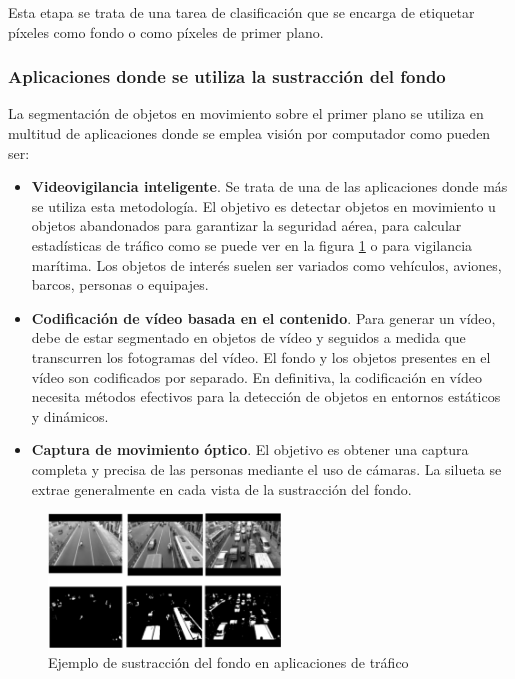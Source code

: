 Esta etapa se trata de una tarea de clasificación que se encarga de etiquetar píxeles como fondo o como píxeles de primer plano.

\subsubsection*{Aplicaciones donde se utiliza la sustracción del fondo}
\label{subsubsec:aplicaciones-background-subtraction}

La segmentación de objetos en movimiento sobre el primer plano se utiliza en multitud de aplicaciones donde se emplea visión por computador como pueden ser:

\begin{itemize}
    \item \textbf{Videovigilancia inteligente}. Se trata de una de las aplicaciones donde más se utiliza esta metodología. El objetivo es detectar objetos en movimiento u objetos abandonados para garantizar la seguridad aérea, para calcular estadísticas de tráfico como se puede ver en la figura \ref{fig:background-subtraction-example} o para vigilancia marítima. Los objetos de interés suelen ser variados como vehículos, aviones, barcos, personas o equipajes.
    \item \textbf{Codificación de vídeo basada en el contenido}. Para generar un vídeo, debe de estar segmentado en objetos de vídeo y seguidos a medida que transcurren los fotogramas del vídeo. El fondo y los objetos presentes en el vídeo son codificados por separado. En definitiva, la codificación en vídeo necesita métodos efectivos para la detección de objetos en entornos estáticos y dinámicos.
    \item \textbf{Captura de movimiento óptico}. El objetivo es obtener una captura completa y precisa de las personas mediante el uso de cámaras. La silueta se extrae generalmente en cada vista de la sustracción del fondo.
\end{itemize}

\begin{figure}[ht]
\centering
\includegraphics[width=0.55\textwidth]{img/chapters/estado-del-arte/background-subtraction-example.jpg}
\caption{\label{fig:background-subtraction-example}Ejemplo de sustracción del fondo en aplicaciones de tráfico}
\end{figure}

